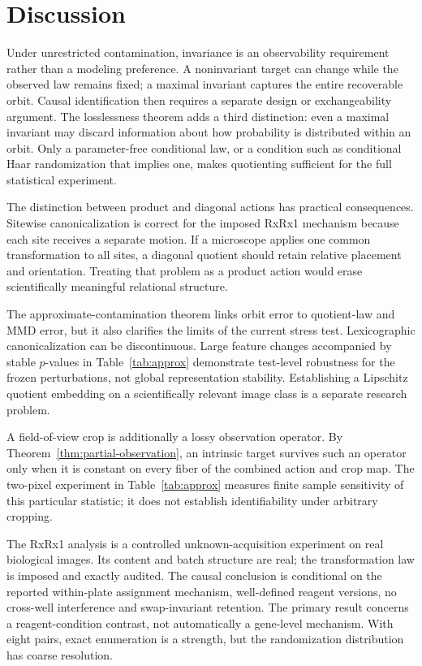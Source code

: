 \documentclass[11pt]{article}
\theoremstyle{plain}
\theoremstyle{definition}
\numberwithin{equation}{section}
\newcommand{\1}{\mathbf 1}
\begin{document}
\FloatBarrier
\section{Discussion}\label{sec:discussion}

Under unrestricted contamination, invariance is an observability requirement rather than a modeling preference. A noninvariant target can change while the observed law remains fixed; a maximal invariant captures the entire recoverable orbit. Causal identification then requires a separate design or exchangeability argument. The losslessness theorem adds a third distinction: even a maximal invariant may discard information about how probability is distributed within an orbit. Only a parameter-free conditional law, or a condition such as conditional Haar randomization that implies one, makes quotienting sufficient for the full statistical experiment.

The distinction between product and diagonal actions has practical consequences. Sitewise canonicalization is correct for the imposed RxRx1 mechanism because each site receives a separate motion. If a microscope applies one common transformation to all sites, a diagonal quotient should retain relative placement and orientation. Treating that problem as a product action would erase scientifically meaningful relational structure.

The approximate-contamination theorem links orbit error to quotient-law and MMD error, but it also clarifies the limits of the current stress test. Lexicographic canonicalization can be discontinuous. Large feature changes accompanied by stable $p$-values in Table~\ref{tab:approx} demonstrate test-level robustness for the frozen perturbations, not global representation stability. Establishing a Lipschitz quotient embedding on a scientifically relevant image class is a separate research problem.

A field-of-view crop is additionally a lossy observation operator. By
Theorem~\ref{thm:partial-observation}, an intrinsic target survives such an
operator only when it is constant on every fiber of the combined action and
crop map. The two-pixel experiment in Table~\ref{tab:approx} measures finite
sample sensitivity of this particular statistic; it does not establish
identifiability under arbitrary cropping.

The RxRx1 analysis is a controlled unknown-acquisition experiment on real biological images. Its content and batch structure are real; the transformation law is imposed and exactly audited. The causal conclusion is conditional on the reported within-plate assignment mechanism, well-defined reagent versions, no cross-well interference and swap-invariant retention. The primary result concerns a reagent-condition contrast, not automatically a gene-level mechanism. With eight pairs, exact enumeration is a strength, but the randomization distribution has coarse resolution.
\end{document}
